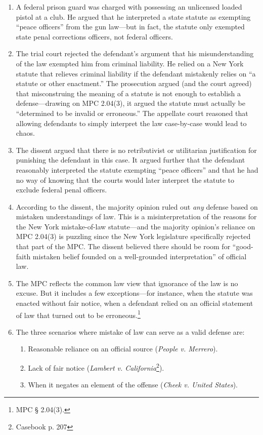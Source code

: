 \begin{enumerate}
    \item A federal prison guard was charged with possessing an unlicensed loaded pistol at a club. He argued that he interpreted a state statute as exempting ``peace officers'' from the gun law---but in fact, the statute only exempted state penal corrections officers, not federal officers.
    \item The trial court rejected the defendant's argument that his misunderstanding of the law exempted him from criminal liability. He relied on a New York statute that relieves criminal liability if the defendant mistakenly relies on ``a statute or other enactment.'' The prosecution argued (and the court agreed) that misconstruing the meaning of a statute is not enough to establish a defense---drawing on MPC 2.04(3), it argued the statute must actually be ``determined to be invalid or erroneous.'' The appellate court reasoned that allowing defendants to simply interpret the law case-by-case would lead to chaos.
    \item The dissent argued that there is no retributivist or utilitarian justification for punishing the defendant in this case. It argued further that the defendant reasonably interpreted the statute exempting ``peace officers'' and that he had no way of knowing that the courts would later interpret the statute to exclude federal penal officers.
    \item According to the dissent, the majority opinion ruled out \emph{any} defense based on mistaken understandings of law. This is a misinterpretation of the reasons for the New York mistake-of-law statute---and the majority opinion's reliance on MPC 2.04(3) is puzzling since the New York legislature specifically rejected that part of the MPC. The dissent believed there should be room for ``good-faith mistaken belief founded on a well-grounded interpretation'' of official law.
    \item The MPC reflects the common law view that ignorance of the law is no excuse. But it includes a few exceptions---for instance, when the statute was enacted without fair notice, when a defendant relied on an official statement of law that turned out to be erroneous.\footnote{MPC § 2.04(3).}
    \item The three scenarios where mistake of law can serve as a valid defense are:
    \begin{enumerate}
        \item Reasonable reliance on an official source (\emph{People v. Merrero}).
        \item Lack of fair notice (\emph{Lambert v. California}\footnote{Casebook p. 207}).
        \item When it negates an element of the offense (\emph{Cheek v. United States}).
    \end{enumerate}
\end{enumerate}


